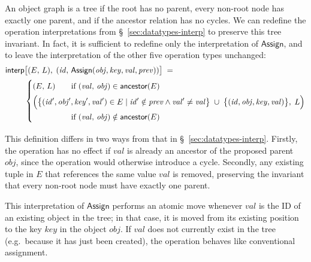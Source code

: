 An object graph is a tree if the root has no parent, every non-root node has exactly one parent, and if the ancestor relation has no cycles.
We can redefine the operation interpretations from \S~\ref{sec:datatypes-interp} to preserve this tree invariant.
In fact, it is sufficient to redefine only the interpretation of $\mathsf{Assign}$, and to leave the interpretation of the other five operation types unchanged:
\begin{align*}
    \mathsf{interp}&\big[(E,\, L),\; (\mathit{id},\, \mathsf{Assign}(\mathit{obj}, \mathit{key}, \mathit{val}, \mathit{prev})) \big] \;=\\
    & \left\{
    \arraycolsep=0pt \def\arraystretch{1.5}
    \begin{array}{l}
        (E,\, L) \qquad \text{if } (\mathit{val},\, \mathit{obj}) \in \mathsf{ancestor}(E) \\[2pt]
        \Big( \big\{ (\mathit{id}', \mathit{obj}', \mathit{key}', \mathit{val}') \in E \mid
        \mathit{id}' \notin \mathit{prev} \wedge \mathit{val}' \neq \mathit{val} \big\} \;\cup\;
        \big\{ (\mathit{id}, \mathit{obj}, \mathit{key}, \mathit{val}) \big\},\; L \Big) \\
        \hphantom{(E,\, L)} \qquad \text{if } (\mathit{val},\, \mathit{obj}) \notin \mathsf{ancestor}(E)
    \end{array} \right.
\end{align*}

This definition differs in two ways from that in \S~\ref{sec:datatypes-interp}.
Firstly, the operation has no effect if $\mathit{val}$ is already an ancestor of the proposed parent $\mathit{obj}$, since the operation would otherwise introduce a cycle.
Secondly, any existing tuple in $E$ that references the same value $\mathit{val}$ is removed, preserving the invariant that every non-root node must have exactly one parent.

This interpretation of $\mathsf{Assign}$ performs an atomic move whenever $\mathit{val}$ is the ID of an existing object in the tree; in that case, it is moved from its existing position to the key $\mathit{key}$ in the object $\mathit{obj}$.
If $\mathit{val}$ does not currently exist in the tree (e.g.\ because it has just been created), the operation behaves like conventional assignment.
